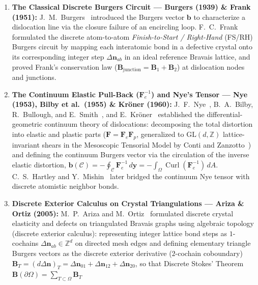 \documentclass[11pt,a4paper]{article}
\newcommand{\Z}{\mathbb{Z}}
\begin{document}
\begin{enumerate}
  \item \textbf{The Classical Discrete Burgers Circuit --- Burgers (1939) \& Frank (1951):}
        J.~M.~Burgers~\cite{Burgers1939} introduced the Burgers vector $\bm{b}$ to characterize a
        dislocation line via the closure failure of an encircling loop. F.~C.~Frank~\cite{Frank1951}
        formulated the discrete atom-to-atom \emph{Finish-to-Start / Right-Hand} (FS/RH) Burgers
        circuit by mapping each interatomic bond in a defective crystal onto its corresponding
        integer step $\Delta\bm{n}_{ab}$ in an ideal reference Bravais lattice, and proved Frank's
        conservation law ($\bm{B}_{\mathrm{junction}} = \bm{B}_1 + \bm{B}_2$) at dislocation nodes
        and junctions.
  \item \textbf{The Continuum Elastic Pull-Back ($\bm{F}_e^{-1}$) and Nye's Tensor --- Nye (1953), Bilby et al.\ (1955) \& Kr\"oner (1960):}
        J.~F.~Nye~\cite{Nye1953}, B.~A.~Bilby, R.~Bullough, and E.~Smith~\cite{Bilby1955}, and
        E.~Kr\"oner~\cite{Kroner1960} established the differential-geometric continuum theory of
        dislocations: decomposing the total distortion into elastic and plastic parts
        ($\bm{F} = \bm{F}_e \bm{F}_p$, generalized to $\mathrm{GL}(d,\Z)$ lattice-invariant shears in
        the Mesoscopic Tensorial Model by Conti and Zanzotto~\cite{ContiZanzotto2004}) and defining
        the continuum Burgers vector via the circulation of the inverse elastic distortion,
        $\bm{b}(\mathcal{C}) = -\oint_{\mathcal{C}} \bm{F}_e^{-1}\,d\bm{y} = -\int_{\Omega}\operatorname{Curl}(\bm{F}_e^{-1})\,dA$.
        C.~S.~Hartley and Y.~Mishin~\cite{HartleyMishin2005} later bridged the continuum Nye tensor
        with discrete atomistic neighbor bonds.
  \item \textbf{Discrete Exterior Calculus on Crystal Triangulations --- Ariza \& Ortiz (2005):}
        M.~P.~Ariza and M.~Ortiz~\cite{ArizaOrtiz2005} formulated discrete crystal elasticity and
        defects on triangulated Bravais graphs using algebraic topology (discrete exterior calculus):
        representing integer lattice bond steps as $1$-cochains $\Delta\bm{n}_{ab} \in \Z^d$ on
        directed mesh edges and defining elementary triangle Burgers vectors as the discrete exterior
        derivative ($2$-cochain coboundary) $\bm{B}_T = (d\Delta\bm{n})_T = \Delta\bm{n}_{01} + \Delta\bm{n}_{12} + \Delta\bm{n}_{20}$,
        so that Discrete Stokes' Theorem $\bm{B}(\partial\Omega) = \sum_{T \subset \Omega} \bm{B}_T$

\end{enumerate}
\end{document}

